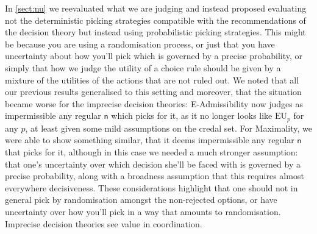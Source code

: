 \documentclass[a4paper]{article}
\newcommand\EU{\mathrm{EU}}
\newcommand{\n}{\mathsf{n}}
\newcommand{\todoold}[2][]{\todo[backgroundcolor=white,bordercolor=orange!10,linecolor=gray!10, #1,caption={},textcolor=gray]{Pre-rev: #2}}
\newenvironment{CCM rewritten}
{\begingroup\color{blue}} %
{\endgroup}              %
\begin{document}

In \cref{sect:nu} we reevaluated what we are judging and instead proposed evaluating not the deterministic picking strategies compatible with the recommendations of the decision theory but instead using probabilistic picking strategies. This might be because you are using a randomisation process, or just that you have uncertainty about how you'll pick which is governed by a precise probability, or simply that how we judge the utility of a choice rule should be given by a mixture of the utilities of the actions that are not ruled out. 
We noted that all our previous results generalised to this setting and moreover, that the situation became worse for the imprecise decision theories:
 E-Admissibility now judges as impermissible any regular $\n$ which picks for it, as it no longer looks like $\EU_p$ for any $p$, at least given some mild assumptions on the credal set. 
For Maximality, we were able to show something similar, that it deems impermissible any regular $\n$ that picks for it, although in this case we needed a much stronger assumption: that one's uncertainty over which decision she'll be faced with is governed by a precise probability, along with a broadness assumption that this requires almost everywhere decisiveness. 
	These considerations highlight that one should not in general pick by randomisation amongst the non-rejected options, or have uncertainty over how you'll pick in a way that amounts to randomisation. Imprecise decision theories see value in coordination. %
\end{document}
